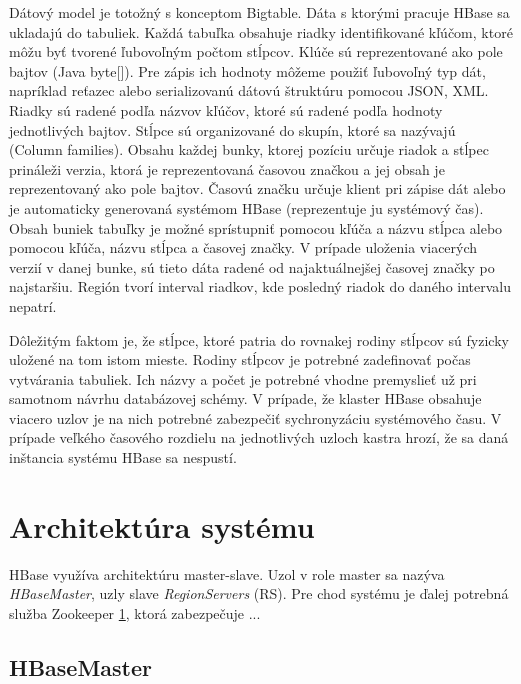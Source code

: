 \documentclass[11pt,twoside,a4paper]{book}
\begin{document}
Dátový model je totožný s konceptom Bigtable. Dáta s ktorými pracuje HBase sa ukladajú do tabuliek. Každá tabuľka obsahuje riadky identifikované kľúčom, ktoré môžu byť tvorené ľubovoľným počtom stĺpcov. Klúče sú reprezentované ako pole bajtov (Java byte[]). Pre zápis ich hodnoty môžeme použiť ľubovoľný typ dát, napríklad reťazec alebo serializovanú dátovú štruktúru pomocou JSON, XML. Riadky sú radené podľa názvov kľúčov, ktoré sú radené podľa hodnoty jednotlivých bajtov. Stĺpce sú organizované do skupín, ktoré sa nazývajú  (Column families). Obsahu každej bunky, ktorej pozíciu určuje riadok a stĺpec prináleži verzia, ktorá je reprezentovaná časovou značkou a jej obsah je reprezentovaný ako pole bajtov. Časovú značku určuje klient pri zápise dát alebo je automaticky generovaná systémom HBase (reprezentuje ju systémový čas). Obsah buniek tabuľky je možné sprístupniť pomocou kľúča a názvu stĺpca alebo pomocou kľúča, názvu stĺpca a časovej značky. V prípade uloženia viacerých verzií v danej bunke, sú tieto dáta radené od najaktuálnejšej časovej značky po najstaršiu. Región tvorí interval riadkov, kde posledný riadok do daného intervalu nepatrí.

Dôležitým faktom je, že stĺpce, ktoré patria do rovnakej rodiny stĺpcov sú fyzicky uložené na tom istom mieste. Rodiny stĺpcov je potrebné zadefinovať počas vytvárania tabuliek. Ich názvy a počet je potrebné vhodne premyslieť už pri samotnom návrhu databázovej schémy. V prípade, že klaster HBase obsahuje viacero uzlov je na nich potrebné zabezpečiť sychronyzáciu systémového času. V prípade veľkého časového rozdielu na jednotlivých uzloch kastra hrozí, že sa daná inštancia systému HBase sa nespustí.


\section{Architektúra systému}

HBase využíva architektúru master-slave. Uzol v role master sa nazýva \emph{HBaseMaster}, uzly slave \emph{RegionServers} (RS). Pre chod systému je ďalej potrebná služba Zookeeper \ref{}, ktorá zabezpečuje ...


\subsection*{HBaseMaster}
\end{document}
